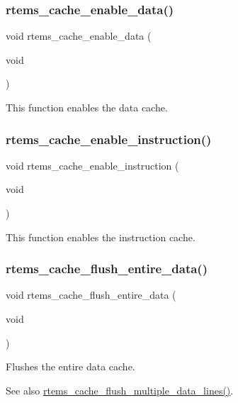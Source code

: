 \subsubsection{\texorpdfstring{rtems\_cache\_enable\_data()}{rtems\_cache\_enable\_data()}}
{\footnotesize\ttfamily void rtems\+\_\+cache\+\_\+enable\+\_\+data (\begin{DoxyParamCaption}\item[{void}]{ }\end{DoxyParamCaption})}

This function enables the data cache. \mbox{\label{group__ClassicCache_gaf8c11725044ff1612a412984fa9ed599}} 
\subsubsection{\texorpdfstring{rtems\_cache\_enable\_instruction()}{rtems\_cache\_enable\_instruction()}}
{\footnotesize\ttfamily void rtems\+\_\+cache\+\_\+enable\+\_\+instruction (\begin{DoxyParamCaption}\item[{void}]{ }\end{DoxyParamCaption})}

This function enables the instruction cache. \mbox{\label{group__ClassicCache_gad3e610ea873a79c5fa28cc5d945dc2a7}} 
\subsubsection{\texorpdfstring{rtems\_cache\_flush\_entire\_data()}{rtems\_cache\_flush\_entire\_data()}}
{\footnotesize\ttfamily void rtems\+\_\+cache\+\_\+flush\+\_\+entire\+\_\+data (\begin{DoxyParamCaption}\item[{void}]{ }\end{DoxyParamCaption})}



Flushes the entire data cache. 

\begin{DoxySeeAlso}{See also}
\mbox{\hyperlink{group__ClassicCache_gab71809c2afd76e0d546b391d0105ca60}{rtems\+\_\+cache\+\_\+flush\+\_\+multiple\+\_\+data\+\_\+lines()}}. 
\end{DoxySeeAlso}
\mbox{\label{group__ClassicCache_gab71809c2afd76e0d546b391d0105ca60}} 
